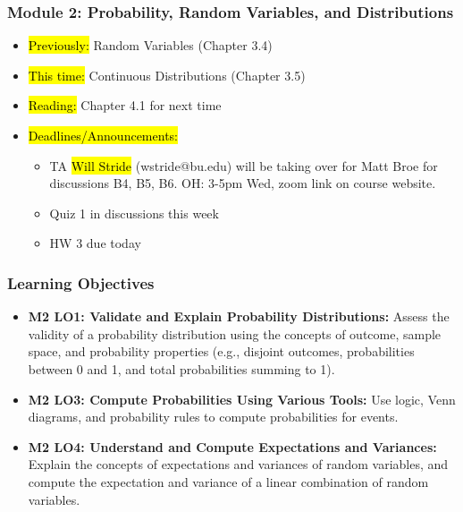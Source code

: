 
\begin{frame}
    \frametitle{Module 2: Probability, Random Variables, and Distributions}
    \begin{itemize}
        \item \hl{Previously: } Random Variables (Chapter 3.4)
        \item \hl{This time: } Continuous Distributions (Chapter 3.5)
        \item \hl{Reading: } Chapter 4.1 for next time
        \item \hl{Deadlines/Announcements: } 
        \begin{itemize}
            \item TA \hl{Will Stride} (wstride@bu.edu) will be taking over for Matt Broe for discussions B4, B5, B6. OH: 3-5pm Wed, zoom link on course website.
            \item Quiz 1 in discussions this week
            \item HW 3 due today
        \end{itemize}
    \end{itemize}
    
\end{frame}

\begin{frame}
    \frametitle{Learning Objectives}
    \begin{itemize}
        \item \textbf{M2 LO1: Validate and Explain Probability Distributions:} Assess the validity of a probability distribution using the concepts of outcome, sample space, and probability properties (e.g., disjoint outcomes, probabilities between 0 and 1, and total probabilities summing to 1).
        \item \textbf{M2 LO3: Compute Probabilities Using Various Tools:} Use logic, Venn diagrams, and probability rules to compute probabilities for events.
        \item \textbf{M2 LO4: Understand and Compute Expectations and Variances:} Explain the concepts of expectations and variances of random variables, and compute the expectation and variance of a linear combination of random variables.
    \end{itemize}
\end{frame}

